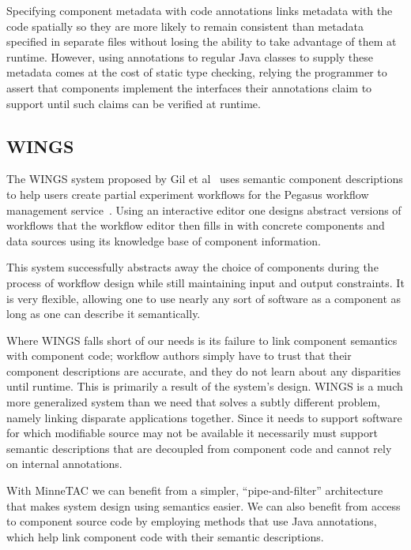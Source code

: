 \documentclass{article}
\begin{document}
Specifying component metadata with code annotations links metadata with the code spatially so they are more likely to remain consistent than metadata specified in separate files without losing the ability to take advantage of them at runtime.
However, using annotations to regular Java classes to supply these metadata comes at the cost of static type checking, relying the programmer to assert that components implement the interfaces their annotations claim to support until such claims can be verified at runtime.


\subsection{WINGS}

The WINGS system proposed by Gil et al~\cite{gil2007wings} uses semantic component descriptions to help users create partial experiment workflows for the Pegasus workflow management service~\cite{callaghan2009scaling}.
Using an interactive editor one designs abstract versions of workflows that the workflow editor then fills in with concrete components and data sources using its knowledge base of component information.

This system successfully abstracts away the choice of components during the process of workflow design while still maintaining input and output constraints.
It is very flexible, allowing one to use nearly any sort of software as a component as long as one can describe it semantically.

Where WINGS falls short of our needs is its failure to link component semantics with component code; workflow authors simply have to trust that their component descriptions are accurate, and they do not learn about any disparities until runtime.
This is primarily a result of the system's design.
WINGS is a much more generalized system than we need that solves a subtly different problem, namely linking disparate applications together.
Since it needs to support software for which modifiable source may not be available it necessarily must support semantic descriptions that are decoupled from component code and cannot rely on internal annotations.

With MinneTAC we can benefit from a simpler, ``pipe-and-filter'' architecture that makes system design using semantics easier.
We can also benefit from access to component source code by employing methods that use Java annotations, which help link component code with their semantic descriptions.
\end{document}
